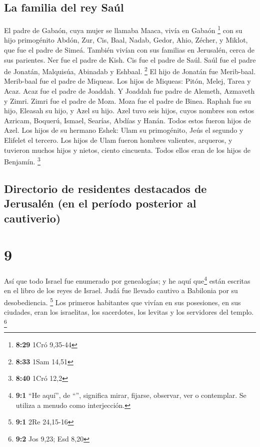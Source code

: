 \hypertarget{la-familia-del-rey-sauxfal}{%
\subsection{La familia del rey Saúl}\label{la-familia-del-rey-sauxfal}}

 El padre de Gabaón, cuya mujer se llamaba Maaca, vivía
en Gabaón \footnote{\textbf{8:29} 1Cró 9,35-44}  con su
hijo primogénito Abdón, Zur, Cis, Baal, Nadab,  Gedor,
Ahio, Zécher,  y Miklot, que fue el padre de Simeá.
También vivían con sus familias en Jerusalén, cerca de sus parientes.
 Ner fue el padre de Kish. Cis fue el padre de Saúl. Saúl
fue el padre de Jonatán, Malquisúa, Abinadab y Eshbaal. \footnote{\textbf{8:33}
  1Sam 14,51}  El hijo de Jonatán fue Merib-baal.
Merib-baal fue el padre de Miqueas.  Los hijos de
Miqueas: Pitón, Melej, Tarea y Acaz.  Acaz fue el padre
de Joaddah. Y Joaddah fue padre de Alemeth, Azmaveth y Zimri. Zimri fue
el padre de Moza.  Moza fue el padre de Binea. Raphah fue
su hijo, Eleasah su hijo, y Azel su hijo.  Azel tuvo seis
hijos, cuyos nombres son estos Azricam, Boquerú, Ismael, Searías, Abdías
y Hanán. Todos estos fueron hijos de Azel.  Los hijos de
su hermano Eshek: Ulam su primogénito, Jeús el segundo y Elifelet el
tercero.  Los hijos de Ulam fueron hombres valientes,
arqueros, y tuvieron muchos hijos y nietos, ciento cincuenta. Todos
ellos eran de los hijos de Benjamín. \footnote{\textbf{8:40} 1Cró 12,2}

\hypertarget{directorio-de-residentes-destacados-de-jerusaluxe9n-en-el-peruxedodo-posterior-al-cautiverio}{%
\subsection{Directorio de residentes destacados de Jerusalén (en el
período posterior al
cautiverio)}\label{directorio-de-residentes-destacados-de-jerusaluxe9n-en-el-peruxedodo-posterior-al-cautiverio}}

\hypertarget{section-8}{%
\section{9}\label{section-8}}

 Así que todo Israel fue enumerado por genealogías; y he
aquí que\footnote{\textbf{9:1} ``He aquí'', de ``'',
  significa mirar, fijarse, observar, ver o contemplar. Se utiliza a
  menudo como interjección.} están escritas en el libro de los reyes de
Israel. Judá fue llevado cautivo a Babilonia por su desobediencia.
\footnote{\textbf{9:1} 2Re 24,15-16}  Los primeros
habitantes que vivían en sus posesiones, en sus ciudades, eran los
israelitas, los sacerdotes, los levitas y los servidores del templo.
\footnote{\textbf{9:2} Jos 9,23; Esd 8,20}

